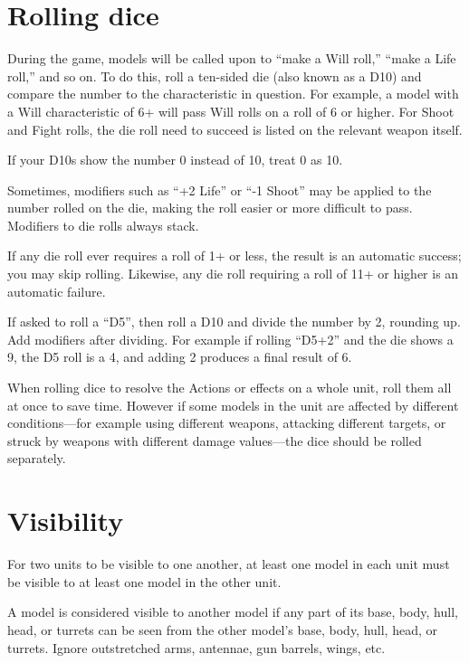 \begin{multicols}{2}
\section*{Rolling dice}

During the game, models will be called upon to ``make a Will roll,'' ``make a Life roll,'' and so on. To do this, roll a ten-sided die (also known as a D10) and compare the number to the characteristic in question. For example, a model with a Will characteristic of 6+ will pass Will rolls on a roll of 6 or higher. For Shoot and Fight rolls, the die roll need to succeed is listed on the relevant weapon itself.

If your D10s show the number 0 instead of 10, treat 0 as 10.

Sometimes, modifiers such as ``+2 Life'' or ``-1 Shoot'' may be applied to the number rolled on the die, making the roll easier or more difficult to pass. Modifiers to die rolls always stack.

If any die roll ever requires a roll of 1+ or less, the result is an automatic success; you may skip rolling. Likewise, any die roll requiring a roll of 11+ or higher is an automatic failure.

If asked to roll a ``D5'', then roll a D10 and divide the number by 2, rounding up. Add modifiers after dividing. For example if rolling ``D5+2'' and the die shows a 9, the D5 roll is a 4, and adding 2 produces a final result of 6.

When rolling dice to resolve the Actions or effects on a whole unit, roll them all at once to save time. However if some models in the unit are affected by different conditions—for example using different weapons, attacking different targets, or struck by weapons with different damage values—the dice should be rolled separately.




\section*{Visibility}

For two units to be visible to one another, at least one model in each unit must be visible to at least one model in the other unit.

A model is considered visible to another model if any part of its base, body, hull, head, or turrets can be seen from the other model's base, body, hull, head, or turrets. Ignore outstretched arms, antennae, gun barrels, wings, etc.


\end{multicols}
